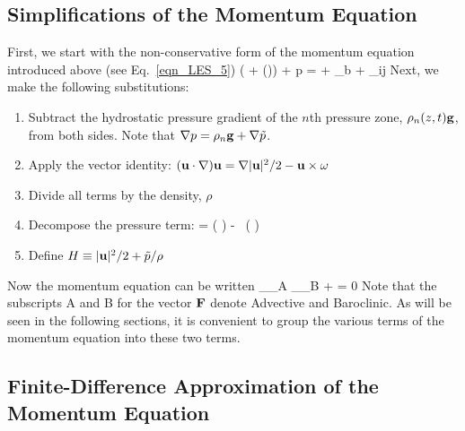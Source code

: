 \subsection{Simplifications of the Momentum Equation}

First, we start with the non-conservative form of the momentum equation introduced above (see Eq.~\ref{eqn_LES_5})
\be
   \rho \left(  + (\bu \cdot \nabla)\bu  \right) + \nabla p = \rho \bg + \bof_b + \nabla\!\cdot \btau_{ij}  \label{momentum}
\ee
Next, we make the following substitutions:
\begin{enumerate}
\item Subtract the hydrostatic pressure gradient of the $n$th pressure zone, $\rho_n(z,t) {\mathbf{g}}$, from both sides. Note that
$\nabla p=\rho_n {\mathbf{g}} + \nabla \tilde{p}$.
\item Apply the vector identity: $({\mathbf{u}} \cdot \nabla) {\mathbf{u}} = \nabla|{\mathbf{u}}|^2/2 - {\mathbf{u}}\times{\mathbf{\omega}} $
\item Divide all terms by the density, $\rho$
\item Decompose the pressure term:
   \be {} \nabla \tp = \nabla \left( \frac{\tp}{\rho}\right) - \tp \, \nabla \left( \right)  \label{p_decomp} \ee
\item Define $H \equiv |{\mathbf{u}}|^2/2 + \tilde{p}/\rho $
\end{enumerate}
Now the momentum equation can be written
\be
    _{\bF_{\rm A}}  _{\bF_{\rm B}} + \nabla \cH =  0 \label{momeq}
\ee
Note that the subscripts A and B for the vector ${\mathbf{F}}$ denote Advective and Baroclinic. As will be seen in the following sections, it is convenient to group the various terms of the momentum equation into these two terms.

\subsection{Finite-Difference Approximation of the Momentum Equation}
\label{findiffmom}

